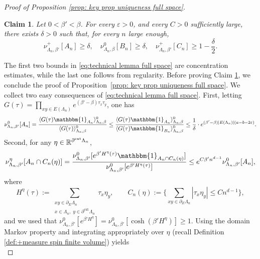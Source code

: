 \documentclass[11pt,a4paper]{article}
\numberwithin{equation}{section}
\theoremstyle{plain}
\newtheorem{Claim}[Thm]{Claim}
\theoremstyle{definition}
\begin{document}
\begin{proof}[Proof of Proposition \textup{\ref{prop: key prop uniqueness full space}}]
\begin{Claim} \label{claim: technical full space}
Let $0 < \beta' < \beta$. For every $\varepsilon>0$, and every $C>0$ sufficiently large, there exists $\delta > 0$ such that, for every $n$ large enough,
\begin{equation}\label{eq:technical lemma full space}
\nu^+_{\Lambda_n,\beta'}[A_n] \geq \delta, \quad \nu^0_{\Lambda_n,\beta}[B_n] \geq \delta, \quad \nu^+_{\Lambda_n,\beta'}[C_n] \geq 1-\frac \delta 2. 
\end{equation}
\end{Claim}
The first two bounds in \eqref{eq:technical lemma full space} are concentration estimates, while the last one follows from regularity. 
Before proving Claim \ref{claim: technical full space}, we conclude the proof of Proposition~\ref{prop: key prop uniqueness full space}. 
We collect two easy consequences of \eqref{eq:technical lemma full space}. First, letting $G(\tau)=\prod_{xy\in E(\Lambda_n)} e^{(\beta'-\beta)\tau_x \tau_y}$, one has
\begin{equation} \label{eq: full space: An}
    \nu^0_{\Lambda_n, \beta'}[A_n]=\frac{\langle G(\tau) \mathbbm{1}_{A_n} \rangle ^0_{\Lambda_n,\beta}}{\langle G(\tau) \rangle^0_{\Lambda_n,\beta}}\leq \frac{\langle G(\tau) \mathbbm{1}_{A_n} \rangle ^0_{\Lambda_n,\beta}}{\langle G(\tau) \mathbbm{1}_{B_n}\rangle^0_{\Lambda_n,\beta}}\leq \frac{1}{\delta}\cdot e^{(\beta'-\beta)|E(\Lambda_n)|(a-b-2\varepsilon)}.
\end{equation}
Second, for any $\eta\in \mathbb R^{\partial^{\textup{ext}}\Lambda_n}$,
\begin{equation}\label{eq: full space: AnCn}
   \nu^\eta_{\Lambda_n,\beta'}[A_n\cap C_n(\eta)]= \frac{ \nu^0_{\Lambda_n,\beta'}[e^{\beta' H^{\eta}(\tau)}\mathbbm{1}_{A_n \cap C_n(\eta)}]}{\nu^0_{\Lambda_n,\beta'}[e^{\beta' H^{\eta}(\tau)}]}\leq e^{C\beta' n^{d-1}}\nu^0_{\Lambda_n,\beta'}[A_n],
\end{equation}
where 
\[
H^\eta(\tau)
:=
\sum_{\substack{xy\in\partial_E\Lambda_n\\
x\in\Lambda_n,\;y\in\partial^{\mathrm{ext}}\Lambda_n}}
\tau_x\eta_y, \qquad C_n(\eta):=\Big\{\sum_{xy\in \partial_E \Lambda_n} |\tau_x \eta_y|\leq Cn^{d-1}\Big\},
\]
and we used that $\nu^0_{\Lambda_n,\beta'}
[e^{\beta' H^\eta}]=
\nu^0_{\Lambda_n,\beta'}
\left[\cosh\left(\beta'H^\eta\right)\right]\geq 1$.
Using the domain Markov property and integrating appropriately over $\eta$ (recall Definition \ref{def:+measure spin finite volume}) yields
\begin{equation}\label{eq: full space:An bis}

\end{equation}
\end{proof}
\end{document}
